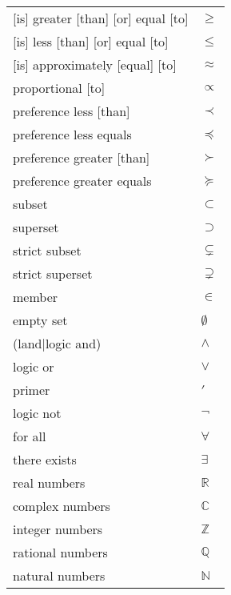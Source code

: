 \documentclass[12pt, a4paper]{article}
\begin{document}
\begin{longtable}{ll}
{[is]} greater [than] [or] equal [to] & $\geq$ \\
{[is]} less [than] [or] equal [to] & $\leq$ \\
{[is]} approximately [equal] [to] & $\approx$ \\
proportional [to] & $\propto$ \\
preference less [than] & $\prec$ \\
preference less equals & $\preceq$ \\
preference greater [than] & $\succ$ \\
preference greater equals & $\succeq$ \\
subset & $\subset$ \\
superset & $\supset$ \\
strict subset & $\subsetneq$ \\
strict superset & $\supsetneq$ \\
member & $\in$ \\
empty set & $\emptyset$ \\
(land|logic and) & $\land$ \\
logic or & $\lor$ \\
primer & $\prime$ \\
logic not & $\lnot$ \\
for all & $\forall$ \\
there exists & $\exists$ \\
real numbers & $\mathbb{R}$ \\
complex numbers & $\mathbb{C}$ \\
integer numbers & $\mathbb{Z}$ \\
rational numbers & $\mathbb{Q}$ \\
natural numbers & $\mathbb{N}$ \\

\end{longtable}
\end{document}
